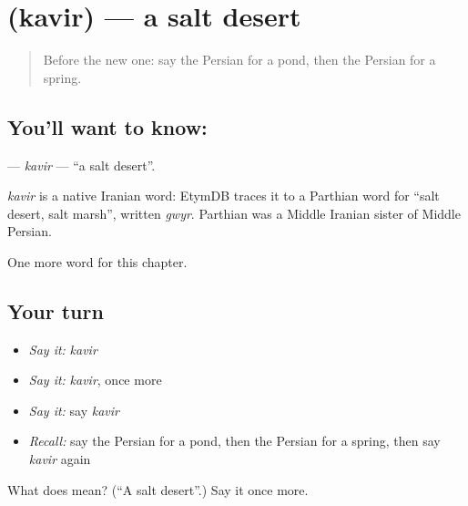 \section[\texorpdfstring{\fa{کویر} (kavir)}{کویر (kavir)}]{ (kavir) — a salt desert}

\label{lesson:FA-C120-kavir}



\begin{quote}
Before the new one: say the Persian for a pond, then the Persian for a spring.
\end{quote}

\subsection*{You'll want to know: }
\textbf{} — \emph{kavir} — \textquotedblleft{}a salt desert\textquotedblright{}.

\begin{cousinweb}
\emph{kavir} is a native Iranian word: EtymDB traces it to a Parthian word for \textquotedblleft{}salt desert, salt marsh\textquotedblright{}, written \emph{gwyr}. Parthian was a Middle Iranian sister of Middle Persian.
\end{cousinweb}

\begin{grammarlens}[title={What you've built}]
One more word for this chapter.
\end{grammarlens}

\subsection*{Your turn}
\begin{itemize}
\raggedright
  \item \emph{Say it:} \emph{kavir}
  \item \emph{Say it:} \emph{kavir}, once more
  \item \emph{Say it:} say \emph{kavir}
  \item \emph{Recall:} say the Persian for a pond, then the Persian for a spring, then say \emph{kavir} again
\end{itemize}

\begin{tcolorbox}[breakable,colback=teal!4,colframe=teal!35!black,title={Before you move on}]
What does  mean? (\textquotedblleft{}A salt desert\textquotedblright{}.) Say it once more.
\end{tcolorbox}
